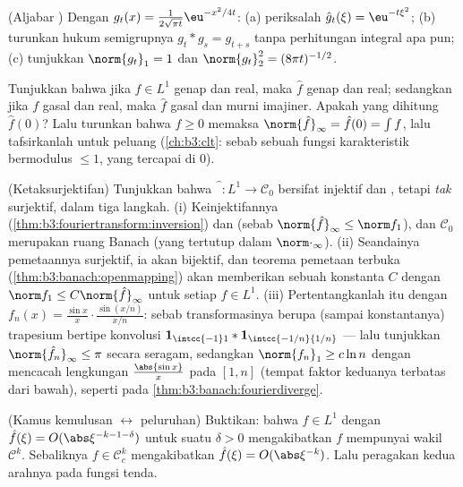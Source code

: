 \begin{exercise}[$\star\star$]\label{exo:b3:fouriertransform:4}
(Aljabar ) Dengan $g_t(x) =
\frac1{2\sqrt{\pi t}}\eu^{-x^2/4t}$:
(a) periksalah $\hat g_t(\xi) = \eu^{-t\xi^2}$;
(b) turunkan hukum semigrupnya $g_t * g_s = g_{t+s}$ tanpa
perhitungan integral apa pun;
(c) tunjukkan $\norm{g_t}_1 = 1$ dan $\norm{g_t}_2^2 =
(8\pi t)^{-1/2}$.
\end{exercise}

\begin{exercise}[$\star\star$]\label{exo:b3:fouriertransform:5}
Tunjukkan bahwa jika $f \in L^1$ genap dan real, maka $\hat f$ genap
dan real; sedangkan jika $f$ gasal dan real, maka $\hat f$ gasal dan murni
imajiner. Apakah yang dihitung $\hat f(0)$? Lalu turunkan bahwa $f \geq
0$ memaksa $\norm{\hat f}_\infty = \hat f(0) = \int f$, lalu
tafsirkanlah untuk  peluang (\cref{ch:b3:clt}: sebab sebuah
fungsi karakteristik bermodulus $\leq 1$, yang tercapai di
$0$).
\end{exercise}

\begin{exercise}[$\star\star\star$]\label{exo:b3:fouriertransform:6}
(Ketaksurjektifan) Tunjukkan bahwa $\widehat{\phantom f}\colon L^1
\to \mathcal C_0$ bersifat injektif dan , tetapi \emph{tak}
surjektif, dalam tiga langkah.
(i) Keinjektifannya (\cref{thm:b3:fouriertransform:inversion}) dan
 (sebab $\norm{\hat f}_\infty \leq \norm f_1$), dan
$\mathcal C_0$ merupakan ruang Banach (yang tertutup dalam
$\norm\cdot_\infty$).
(ii) Seandainya pemetaannya surjektif, ia akan bijektif, dan
teorema pemetaan terbuka (\cref{thm:b3:banach:openmapping})
akan memberikan sebuah konstanta $C$ dengan $\norm f_1 \leq C\norm{\hat
f}_\infty$ untuk setiap $f \in L^1$.
(iii) Pertentangkanlah itu dengan $f_n(x) = \frac{\sin
x}{x}\cdot\frac{\sin(x/n)}{x/n}$: sebab transformasinya berupa (sampai
konstantanya) trapesium bertipe konvolusi $\mathbf 1_{\intcc{-1}1} *
\mathbf 1_{\intcc{-1/n}{1/n}}$ --- lalu tunjukkan
$\norm{\hat f_n}_\infty \leq \pi$ secara seragam, sedangkan
$\norm{f_n}_1 \geq c\ln n$ dengan mencacah lengkungan
$\frac{\abs{\sin x}}x$ pada $[1, n]$ (tempat faktor keduanya
terbatas dari bawah), seperti pada \cref{thm:b3:banach:fourierdiverge}.
\end{exercise}

\begin{exercise}[$\star\star$]\label{exo:b3:fouriertransform:7}
(Kamus kemulusan $\leftrightarrow$ peluruhan) Buktikan: bahwa $f \in
L^1$ dengan $\hat f(\xi) = O(\abs\xi^{-k-1-\delta})$ untuk suatu
$\delta > 0$ mengakibatkan $f$ mempunyai wakil $\mathcal C^k$.
Sebaliknya $f \in \mathcal C^k_c$ mengakibatkan $\hat f(\xi) =
O(\abs\xi^{-k})$. Lalu peragakan kedua arahnya pada fungsi
tenda.
\end{exercise}

